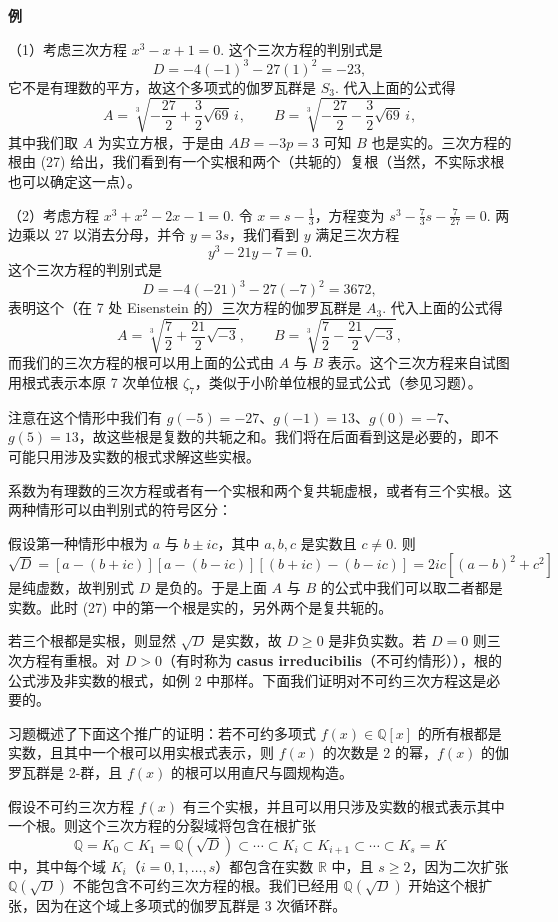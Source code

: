 \noindent\textbf{例}

（1）考虑三次方程 \(x^3-x+1 = 0\). 这个三次方程的判别式是
\[
D = -4(-1)^3-27(1)^2 = -23,
\]
它不是有理数的平方，故这个多项式的伽罗瓦群是 \(S_3\). 代入上面的公式得
\[
A = \sqrt[3]{-\frac{27}{2}+\frac{3}{2}\sqrt{69}\,i}, \qquad B = \sqrt[3]{-\frac{27}{2}-\frac{3}{2}\sqrt{69}\,i},
\]
其中我们取 \(A\) 为实立方根，于是由 \(AB = -3p = 3\) 可知 \(B\) 也是实的。三次方程的根由 (27) 给出，我们看到有一个实根和两个（共轭的）复根（当然，不实际求根也可以确定这一点）。

（2）考虑方程 \(x^3+x^2-2x-1 = 0\). 令 \(x = s-\frac{1}{3}\)，方程变为 \(s^3-\frac{7}{3}s-\frac{7}{27} = 0\). 两边乘以 27 以消去分母，并令 \(y = 3s\)，我们看到 \(y\) 满足三次方程
\[
y^3-21y-7 = 0.
\]
这个三次方程的判别式是
\[
D = -4(-21)^3-27(-7)^2 = 3672,
\]
表明这个（在 7 处 Eisenstein 的）三次方程的伽罗瓦群是 \(A_3\). 代入上面的公式得
\[
A = \sqrt[3]{\frac{7}{2}+\frac{21}{2}\sqrt{-3}}, \qquad B = \sqrt[3]{\frac{7}{2}-\frac{21}{2}\sqrt{-3}},
\]
而我们的三次方程的根可以用上面的公式由 \(A\) 与 \(B\) 表示。这个三次方程来自试图用根式表示本原 7 次单位根 \(\zeta_7\)，类似于小阶单位根的显式公式（参见习题）。

注意在这个情形中我们有 \(g(-5) = -27\)、\(g(-1) = 13\)、\(g(0) = -7\)、\(g(5) = 13\)，故这些根是复数的共轭之和。我们将在后面看到这是必要的，即不可能只用涉及实数的根式求解这些实根。

系数为有理数的三次方程或者有一个实根和两个复共轭虚根，或者有三个实根。这两种情形可以由判别式的符号区分：

假设第一种情形中根为 \(a\) 与 \(b \pm ic\)，其中 \(a, b, c\) 是实数且 \(c \neq 0\). 则
\[
\sqrt{D} = [a-(b+ic)][a-(b-ic)][(b+ic)-(b-ic)] = 2ic\left[(a-b)^2+c^2\right]
\]
是纯虚数，故判别式 \(D\) 是负的。于是上面 \(A\) 与 \(B\) 的公式中我们可以取二者都是实数。此时 (27) 中的第一个根是实的，另外两个是复共轭的。

若三个根都是实根，则显然 \(\sqrt{D}\) 是实数，故 \(D \geq 0\) 是非负实数。若 \(D = 0\) 则三次方程有重根。对 \(D > 0\)（有时称为 \textbf{casus irreducibilis}（不可约情形）），根的公式涉及非实数的根式，如例 2 中那样。下面我们证明对不可约三次方程这是必要的。

习题概述了下面这个推广的证明：若不可约多项式 \(f(x) \in \mathbb{Q}[x]\) 的所有根都是实数，且其中一个根可以用实根式表示，则 \(f(x)\) 的次数是 2 的幂，\(f(x)\) 的伽罗瓦群是 2-群，且 \(f(x)\) 的根可以用直尺与圆规构造。

假设不可约三次方程 \(f(x)\) 有三个实根，并且可以用只涉及实数的根式表示其中一个根。则这个三次方程的分裂域将包含在根扩张
\[
\mathbb{Q} = K_0 \subset K_1 = \mathbb{Q}(\sqrt{D}) \subset \cdots \subset K_i \subset K_{i+1} \subset \cdots \subset K_s = K
\]
中，其中每个域 \(K_i\)（\(i = 0, 1, \ldots, s\)）都包含在实数 \(\mathbb{R}\) 中，且 \(s \geq 2\)，因为二次扩张 \(\mathbb{Q}(\sqrt{D})\) 不能包含不可约三次方程的根。我们已经用 \(\mathbb{Q}(\sqrt{D})\) 开始这个根扩张，因为在这个域上多项式的伽罗瓦群是 3 次循环群。

